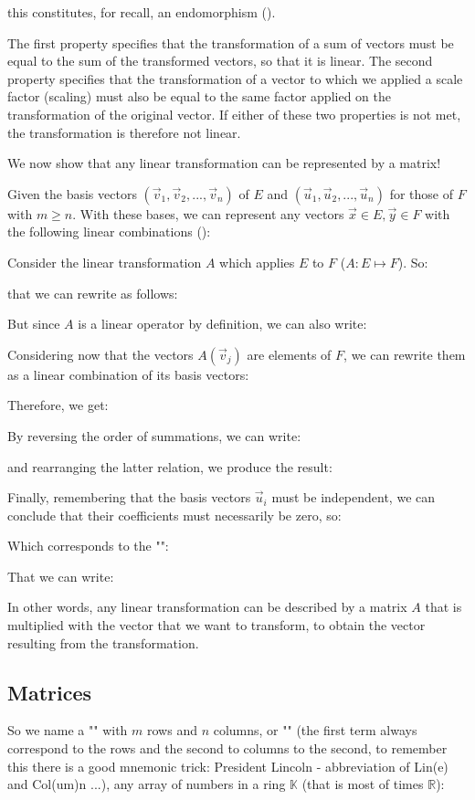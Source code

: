 	this constitutes, for recall, an endomorphism\label{matrix endomorphism} ().

	The first property specifies that the transformation of a sum of vectors must be equal to the sum of the transformed vectors, so that it is linear. The second property specifies that the transformation of a vector to  which we applied a scale factor (scaling) must also be equal to the same factor applied on the transformation of the original vector. If either of these two properties is not met, the transformation is therefore not linear.

	We now show that any linear transformation can be represented by a matrix!

	Given the basis vectors $\left(\vec{v}_1,\vec{v}_2,...,\vec{v}_n \right)$ of $E$ and $\left(\vec{u}_1,\vec{u}_2,...,\vec{u}_n \right)$ for those of $F$ with $m \geq n$. With these bases, we can represent any vectors $\vec{x} \in E, \vec{y} \in F$ with the following linear combinations ():
	
	Consider the linear transformation $A$ which applies $E$ to $F$ ($A:E\mapsto F$). So:
			
	that we can rewrite as follows:
	
	But since $A$ is a linear operator by definition, we can also write:
	
	Considering now that the vectors $A(\vec{v}_j)$ are elements of $F$, we can rewrite them as a linear combination of its basis vectors:
	
	Therefore, we get:
	
	By reversing the order of summations, we can write:
	
	and rearranging the latter relation, we produce the result:
	
	Finally, remembering that the basis vectors $\vec{u}_i$  must be independent, we can conclude that their coefficients must necessarily be zero, so:
	
	Which corresponds to the "":
	
	That we can write:
	
	In other words, any linear transformation can be described by a matrix $A$ that is multiplied with the vector that we want to transform, to obtain the vector resulting from the transformation.
	
	\pagebreak
	\subsection{Matrices}
	So we name a "" with $m$ rows and $n$ columns, or "" (the first term always correspond to the rows and the second to columns to the second, to remember this there is a good mnemonic trick: President Lincoln - abbreviation of Lin(e) and Col(um)n ...), any array of numbers in a ring $\mathbb{K}$ (that is most of times $\mathbb{R}$):
	
